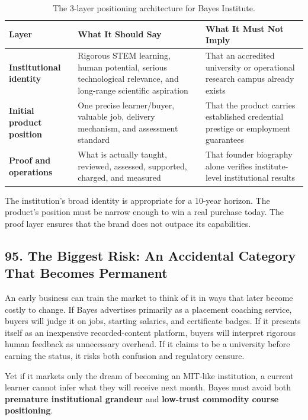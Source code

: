 \begin{table}[t]
\centering
\small
\begin{tabularx}{\textwidth}{>{\raggedright\arraybackslash}p{4cm} >{\raggedright\arraybackslash}X >{\raggedright\arraybackslash}X}
\toprule
\textbf{Layer} & \textbf{What It Should Say} & \textbf{What It Must Not Imply} \\
\midrule
\textbf{Institutional identity} & Rigorous STEM learning, human potential, serious technological relevance, and long-range scientific aspiration & That an accredited university or operational research campus already exists \\
\textbf{Initial product position} & One precise learner/buyer, valuable job, delivery mechanism, and assessment standard & That the product carries established credential prestige or employment guarantees \\
\textbf{Proof and operations} & What is actually taught, reviewed, assessed, supported, charged, and measured & That founder biography alone verifies institute-level institutional results \\
\bottomrule
\end{tabularx}
\caption{The 3-layer positioning architecture for Bayes Institute.}
\label{tab:ch8-bayes-positioning-layers}
\end{table}

The institution's broad identity is appropriate for a 10-year horizon. The product's position must be narrow enough to win a real purchase today. The proof layer ensures that the brand does not outpace its capabilities.

\subsection*{95. The Biggest Risk: An Accidental Category That Becomes Permanent}

An early business can train the market to think of it in ways that later become costly to change. If Bayes advertises primarily as a placement coaching service, buyers will judge it on jobs, starting salaries, and certificate badges. If it presents itself as an inexpensive recorded-content platform, buyers will interpret rigorous human feedback as unnecessary overhead. If it claims to be a university before earning the status, it risks both confusion and regulatory censure.

Yet if it markets only the dream of becoming an MIT-like institution, a current learner cannot infer what they will receive next month. Bayes must avoid both \textbf{premature institutional grandeur} and \textbf{low-trust commodity course positioning}.

